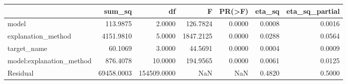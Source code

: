 \begin{tabular}{lrrrrrr}
\toprule
 & sum_sq & df & F & PR(>F) & eta_sq & eta_sq_partial \\
\midrule
model & 113.9875 & 2.0000 & 126.7824 & 0.0000 & 0.0008 & 0.0016 \\
explanation_method & 4151.9810 & 5.0000 & 1847.2125 & 0.0000 & 0.0288 & 0.0564 \\
target_name & 60.1069 & 3.0000 & 44.5691 & 0.0000 & 0.0004 & 0.0009 \\
model:explanation_method & 876.4078 & 10.0000 & 194.9565 & 0.0000 & 0.0061 & 0.0125 \\
Residual & 69458.0003 & 154509.0000 & NaN & NaN & 0.4820 & 0.5000 \\
\bottomrule
\end{tabular}
